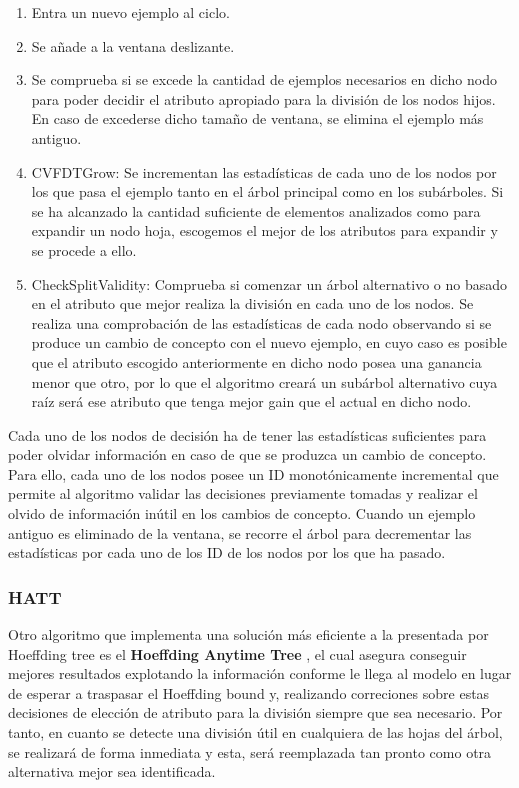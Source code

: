 \begin{enumerate}
	\item Entra un nuevo ejemplo al ciclo.
	\item Se añade a la ventana deslizante.
	\item Se comprueba si se excede la cantidad de ejemplos necesarios en dicho nodo para poder decidir el atributo apropiado para la división de los nodos hijos. En caso de excederse dicho tamaño de ventana, se elimina el ejemplo más antiguo.
	\item CVFDTGrow: Se incrementan las estadísticas de cada uno de los nodos por los que pasa el ejemplo tanto en el árbol principal como en los subárboles. Si se ha alcanzado la cantidad suficiente de elementos analizados como para expandir un nodo hoja, escogemos el mejor de los atributos para expandir y se procede a ello.
	\item CheckSplitValidity: Comprueba si comenzar un árbol alternativo o no basado en el atributo que mejor realiza la división en cada uno de los nodos. Se realiza una comprobación de las estadísticas de cada nodo observando si se produce un cambio de concepto con el nuevo ejemplo, en cuyo caso es posible que el atributo escogido anteriormente en dicho nodo posea una ganancia menor que otro, por lo que el algoritmo creará un subárbol alternativo cuya raíz será ese atributo que tenga mejor gain que el actual en dicho nodo.
\end{enumerate}

Cada uno de los nodos de decisión ha de tener las estadísticas suficientes para poder olvidar información en caso de que se produzca un cambio de concepto. Para ello, cada uno de los nodos posee un ID monotónicamente incremental que permite al algoritmo validar las decisiones previamente tomadas y realizar el olvido de información inútil en los cambios de concepto. Cuando un ejemplo antiguo es eliminado de la ventana, se recorre el árbol para decrementar las estadísticas por cada uno de los ID de los nodos por los que ha pasado.


\subsubsection{HATT}

Otro algoritmo que implementa una solución más eficiente a la presentada por Hoeffding tree es el \textbf{Hoeffding Anytime Tree} \cite{ref10}, el cual asegura conseguir mejores resultados explotando la información conforme le llega al modelo en lugar de esperar a traspasar el Hoeffding bound y, realizando correciones sobre estas decisiones de elección de atributo para la división siempre que sea necesario.
Por tanto, en cuanto se detecte una división útil en cualquiera de las hojas del árbol, se realizará de forma inmediata y esta, será reemplazada tan pronto como otra alternativa mejor sea identificada.

